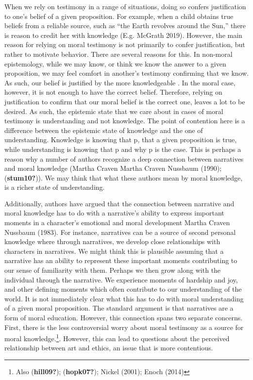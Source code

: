 \documentclass[12pt]{book}
\theoremstyle{definition}
\theoremstyle{remark}
\begin{document}
When we rely on testimony in a range of situations, doing so confers justification to one's belief of a given proposition. For example, when a child obtains true beliefs from a reliable source, such as ``the Earth revolves around the Sun,'' there is reason to credit her with knowledge (E.g. McGrath 2019). However, the main reason for relying on moral testimony is not primarily to confer justification, but rather to motivate behavior. There are several reasons for this. In non-moral epistemology, while we may know, or think we know the answer to a given proposition, we may feel comfort in another's testimony confirming that we know. As such, our belief is justified by the more knowledgeable . In the moral case, however, it is not enough to have the correct belief. Therefore, relying on justification to confirm that our moral belief is the correct one, leaves a lot to be desired. As such, the epistemic state that we care about in cases of moral testimony is understanding and not knowledge. The point of contention here is a difference between the epistemic state of knowledge and the one of understanding. Knowledge is knowing that p, that a given proposition is true, while understanding is knowing that p and why p is the case. This is perhaps a reason why a number of authors recognize a deep connection between narratives and moral knowledge (Martha Craven Martha Craven Nussbaum (1990); (\textbf{stum10?})). We may think that what these authors mean by moral knowledge, is a richer state of understanding.

Additionally, authors have argued that the connection between narrative and moral knowledge has to do with a narrative's ability to express important moments in a character's emotional and moral development Martha Craven Nussbaum (1983). For instance, narratives can be a source of second personal knowledge where through narratives, we develop close relationships with characters in narratives. We might think this is plausible assuming that a narrative has an ability to represent these important moments contributing to our sense of familiarity with them. Perhaps we then grow along with the individual through the narrative. We experience moments of hardship and joy, and other defining moments which often contribute to our understanding of the world. It is not immediately clear what this has to do with moral understanding of a given moral proposition. The standard argument is that narratives are a form of moral education. However, this connection spans two separate concerns. First, there is the less controversial worry about moral testimony as a source for moral knowledge.\footnote{Also (\textbf{hill09?}); (\textbf{hopk07?}); Nickel (2001); Enoch (2014)}. However, this can lead to questions about the perceived relationship between art and ethics, an issue that is more contentious.
\end{document}
